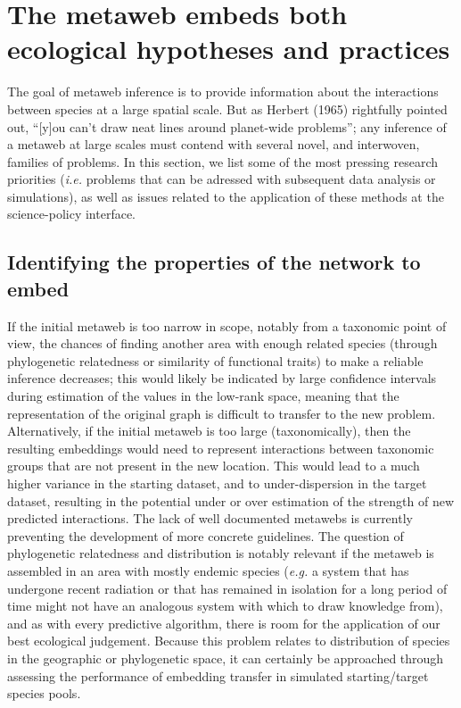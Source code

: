 \documentclass[11pt]{article}
\begin{document}
\hypertarget{the-metaweb-embeds-both-ecological-hypotheses-and-practices}{%
\section{The metaweb embeds both ecological hypotheses and
practices}\label{the-metaweb-embeds-both-ecological-hypotheses-and-practices}}

The goal of metaweb inference is to provide information about the
interactions between species at a large spatial scale. But as Herbert
(1965) rightfully pointed out, ``{[}y{]}ou can't draw neat lines around
planet-wide problems''; any inference of a metaweb at large scales must
contend with several novel, and interwoven, families of problems. In
this section, we list some of the most pressing research priorities
(\emph{i.e.} problems that can be adressed with subsequent data analysis
or simulations), as well as issues related to the application of these
methods at the science-policy interface.

\hypertarget{identifying-the-properties-of-the-network-to-embed}{%
\subsection{Identifying the properties of the network to
embed}\label{identifying-the-properties-of-the-network-to-embed}}

If the initial metaweb is too narrow in scope, notably from a taxonomic
point of view, the chances of finding another area with enough related
species (through phylogenetic relatedness or similarity of functional
traits) to make a reliable inference decreases; this would likely be
indicated by large confidence intervals during estimation of the values
in the low-rank space, meaning that the representation of the original
graph is difficult to transfer to the new problem. Alternatively, if the
initial metaweb is too large (taxonomically), then the resulting
embeddings would need to represent interactions between taxonomic groups
that are not present in the new location. This would lead to a much
higher variance in the starting dataset, and to under-dispersion in the
target dataset, resulting in the potential under or over estimation of
the strength of new predicted interactions. The lack of well documented
metawebs is currently preventing the development of more concrete
guidelines. The question of phylogenetic relatedness and distribution is
notably relevant if the metaweb is assembled in an area with mostly
endemic species (\emph{e.g.} a system that has undergone recent
radiation or that has remained in isolation for a long period of time
might not have an analogous system with which to draw knowledge from),
and as with every predictive algorithm, there is room for the
application of our best ecological judgement. Because this problem
relates to distribution of species in the geographic or phylogenetic
space, it can certainly be approached through assessing the performance
of embedding transfer in simulated starting/target species pools.
\end{document}
